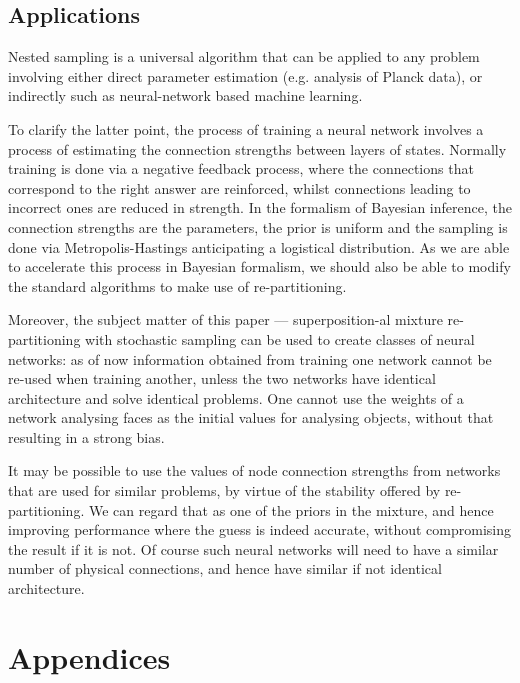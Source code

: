 \documentclass[usenatbib]{mnras}
\begin{document}
\subsection{Applications}
\label{sec:orgde0ff75}
Nested sampling is a universal algorithm that can be applied to any
problem involving either direct parameter estimation (e.g. analysis
of Planck data), or indirectly such as neural-network based machine
learning.

To clarify the latter point, the process of training a neural
network involves a process of estimating the connection strengths
between layers of states. Normally training is done via a negative
feedback process, where the connections that correspond to the
right answer are reinforced, whilst connections leading to
incorrect ones are reduced in strength. In the formalism of
Bayesian inference, the connection strengths are the parameters,
the prior is uniform and the sampling is done via
Metropolis-Hastings anticipating a logistical distribution. As we
are able to accelerate this process in Bayesian formalism, we
should also be able to modify the standard algorithms to make use
of re-partitioning.

Moreover, the subject matter of this paper --- superposition-al
mixture re-partitioning with stochastic sampling can be used to
create classes of neural networks: as of now information obtained
from training one network cannot be re-used when training another,
unless the two networks have identical architecture and solve
identical problems. One cannot use the weights of a network
analysing faces as the initial values for analysing objects,
without that resulting in a strong bias.

It may be possible to use the values of node connection strengths
from networks that are used for similar problems, by virtue of the
stability offered by re-partitioning. We can regard that as one of
the priors in the mixture, and hence improving performance where
the guess is indeed accurate, without compromising the result if it
is not. Of course such neural networks will need to have a similar
number of physical connections, and hence have similar if not
identical architecture.

 


\section{Appendices}
\label{sec:orgc7e198b}
\end{document}
